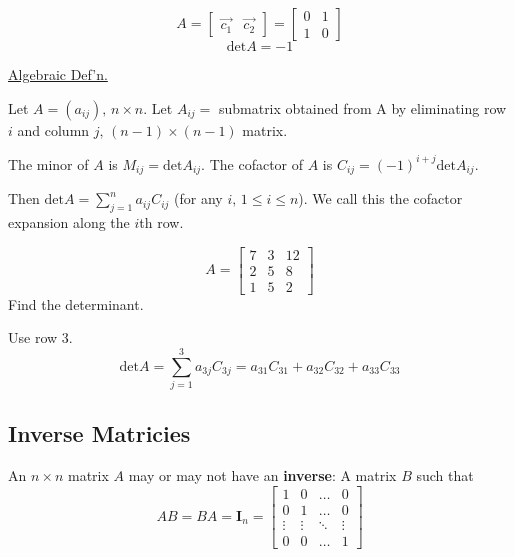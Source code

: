 \documentclass[../main.tex]{subfiles}
\begin{document}
\begin{example}[]
    \[ A = \begin{bmatrix}
        \vec{c_1} & \vec{c_2}
    \end{bmatrix} = \begin{bmatrix}
        0 & 1 \\
        1 & 0
    \end{bmatrix} \]
    \[ \text{det}A = -1 \]

\end{example}

\underline{Algebraic Def'n.}

Let \( A = \left( a_{ij} \right), \, n \times n\).
Let \( A_{ij} = \) submatrix obtained from A by eliminating row \( i \) and column \( j, \, (n-1) \times (n-1) \) matrix.

The minor of \( A \) is \( M_{ij} = \text{det}A_{ij}\).
The cofactor of \( A \) is \( C_{ij} = (-1)^{i+j}\text{det}A_{ij}\).

Then \( \text{det}A = \sum_{j=1}^{n}a_{ij}C_{ij} \) (for any \( i, \, 1 \leq i \leq n \)).
We call this the cofactor expansion along the \( i \)th row.

\begin{example}[]
    \[ A = \begin{bmatrix}
        7 & 3 & 12 \\
        2 & 5 & 8 \\
        1 & 5 & 2
    \end{bmatrix} \]
    Find the determinant.

    Use row 3.
    \[ \text{det}A = \sum_{j=1}^{3} a_{3j} C_{3j} = a_{31}C_{31} + a_{32}C_{32} + a_{33}C_{33} \]

    
\end{example}


\subsection{Inverse Matricies}

An \( n \times n \) matrix \( A \) may or may not have an \textbf{inverse}: A matrix \( B \) such that
\[ AB=BA = \mathbf{I}_n = \begin{bmatrix}
    1 & 0 &  \dots  & 0 \\
    0 & 1 & \dots & 0 \\
    \vdots & \vdots & \ddots & \vdots \\
    0 & 0 & \dots  & 1
\end{bmatrix}
\]
\end{document}
